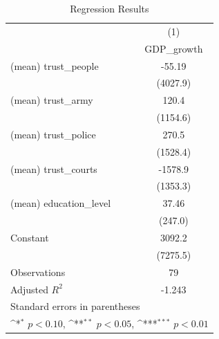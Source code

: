 \begin{table}[htbp]\centering
\def\sym#1{\ifmmode^{#1}\else\(^{#1}\)\fi}
\caption{Regression Results}
\begin{tabular}{l*{1}{c}}
\hline\hline
                    &\multicolumn{1}{c}{(1)}\\
                    &\multicolumn{1}{c}{GDP\_growth}\\
\hline
(mean) trust\_people &      -55.19         \\
                    &    (4027.9)         \\
[1em]
(mean) trust\_army   &       120.4         \\
                    &    (1154.6)         \\
[1em]
(mean) trust\_police &       270.5         \\
                    &    (1528.4)         \\
[1em]
(mean) trust\_courts &     -1578.9         \\
                    &    (1353.3)         \\
[1em]
(mean) education\_level&       37.46         \\
                    &     (247.0)         \\
[1em]
Constant            &      3092.2         \\
                    &    (7275.5)         \\
\hline
Observations        &          79         \\
Adjusted \(R^{2}\)  &      -1.243         \\
\hline\hline
\multicolumn{2}{l}{\footnotesize Standard errors in parentheses}\\
\multicolumn{2}{l}{\footnotesize \sym{*} \(p<0.10\), \sym{**} \(p<0.05\), \sym{***} \(p<0.01\)}\\
\end{tabular}
\end{table}

